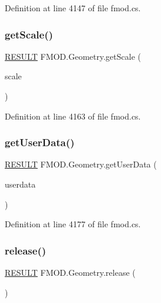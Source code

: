Definition at line 4147 of file fmod.\+cs.

\mbox{\label{class_f_m_o_d_1_1_geometry_aae31972e889008ca660f0458c7a13459}} 
\subsubsection{\texorpdfstring{get\+Scale()}{getScale()}}
{\footnotesize\ttfamily \hyperlink{namespace_f_m_o_d_a305d1176ef3f8c8815861a60407ac33d}{R\+E\+S\+U\+LT} F\+M\+O\+D.\+Geometry.\+get\+Scale (\begin{DoxyParamCaption}\item[{out \hyperlink{struct_f_m_o_d_1_1_v_e_c_t_o_r}{V\+E\+C\+T\+OR}}]{scale }\end{DoxyParamCaption})}



Definition at line 4163 of file fmod.\+cs.

\mbox{\label{class_f_m_o_d_1_1_geometry_a988a68c2633336b5ee8a6654e11a1c8e}} 
\subsubsection{\texorpdfstring{get\+User\+Data()}{getUserData()}}
{\footnotesize\ttfamily \hyperlink{namespace_f_m_o_d_a305d1176ef3f8c8815861a60407ac33d}{R\+E\+S\+U\+LT} F\+M\+O\+D.\+Geometry.\+get\+User\+Data (\begin{DoxyParamCaption}\item[{out Int\+Ptr}]{userdata }\end{DoxyParamCaption})}



Definition at line 4177 of file fmod.\+cs.

\mbox{\label{class_f_m_o_d_1_1_geometry_a55059fcb7fce590d4135cb84404d7cbb}} 
\subsubsection{\texorpdfstring{release()}{release()}}
{\footnotesize\ttfamily \hyperlink{namespace_f_m_o_d_a305d1176ef3f8c8815861a60407ac33d}{R\+E\+S\+U\+LT} F\+M\+O\+D.\+Geometry.\+release (\begin{DoxyParamCaption}{ }\end{DoxyParamCaption})}



